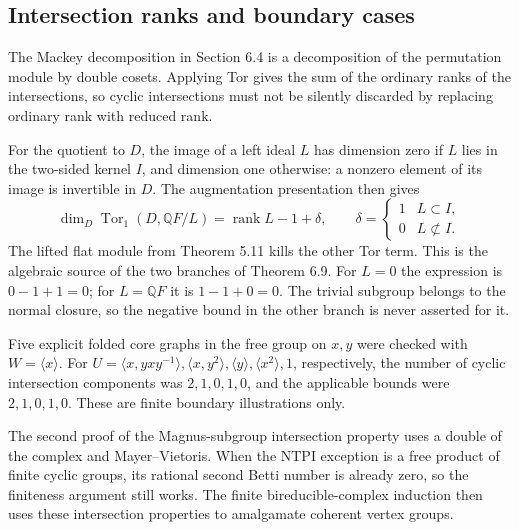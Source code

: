 \documentclass[10pt]{article}
\begin{document}
\subsection*{Intersection ranks and boundary cases}
The Mackey decomposition in Section 6.4 is a decomposition of the permutation module by double cosets. Applying Tor gives the sum of the ordinary ranks of the intersections, so cyclic intersections must not be silently discarded by replacing ordinary rank with reduced rank.\par
For the quotient to \(D\), the image of a left ideal \(L\) has dimension zero if \(L\) lies in the two-sided kernel \(I\), and dimension one otherwise: a nonzero element of its image is invertible in \(D\). The augmentation presentation then gives \[\dim_D\operatorname{Tor}_1(D,\mathbb QF/L)=\operatorname{rank}L-1+\delta,\qquad
 \delta=\begin{cases}1&L\subset I,\\0&L\not\subset I.\end{cases}\] The lifted flat module from Theorem 5.11 kills the other Tor term. This is the algebraic source of the two branches of Theorem 6.9. For \(L=0\) the expression is \(0-1+1=0\); for \(L=\mathbb QF\) it is \(1-1+0=0\). The trivial subgroup belongs to the normal closure, so the negative bound in the other branch is never asserted for it.\par
Five explicit folded core graphs in the free group on \(x,y\) were checked with \(W=\langle x\rangle\). For \(U=\langle x,yxy^{-1}\rangle,\langle x,y^2\rangle,
\langle y\rangle,\langle x^2\rangle,1\), respectively, the number of cyclic intersection components was \(2,1,0,1,0\), and the applicable bounds were \(2,1,0,1,0\). These are finite boundary illustrations only.\par
The second proof of the Magnus-subgroup intersection property uses a double of the complex and Mayer–Vietoris. When the NTPI exception is a free product of finite cyclic groups, its rational second Betti number is already zero, so the finiteness argument still works. The finite bireducible-complex induction then uses these intersection properties to amalgamate coherent vertex groups.\par
\end{document}
